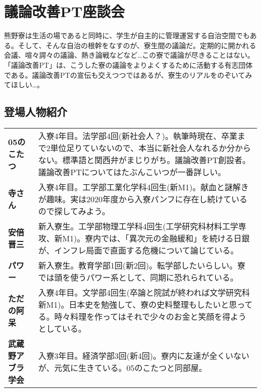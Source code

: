 

\section{議論改善PT座談会}
\label{sec:gironkaizen}

熊野寮は生活の場であると同時に、学生が自主的に管理運営する自治空間でもある。そして、そんな自治の根幹をなすのが、寮生間の議論だ。定期的に開かれる会議、喧々諤々の議論、熱き論戦などなど…この寮で議論が尽きることはない。「議論改善PT」は、こうした寮の議論をよりよくするために活動する有志団体である。議論改善PTの宣伝も交えつつではあるが、寮生のリアルをのぞいてみてほしい…。

\subsection{登場人物紹介}

\begin{table}[h]
    \begin{tabular}{lp{13cm}}
        \hline
        \vspace{2mm}
\textbf{05のこたつ}
&
入寮4年目。法学部4回(新社会人？)。執筆時現在、卒業まで2単位足りていないので、本当に新社会人なれるか分からない。標準語と関西弁がまじりがち。議論改善PT創設者。議論改善PTについてはたぶんこいつが一番詳しい。
\\
\vspace{2mm}
\textbf{寺さん}
&
入寮4年目。工学部工業化学科4回生(新M1)。献血と謎解きが趣味。実は2020年度から入寮パンフに存在し続けているので探してみよう。
\\
\vspace{2mm}
\textbf{安倍晋三}
&
新入寮生。工学部物理工学科4回生(工学研究科材料工学専攻、新M1)。寮内では、「異次元の金融緩和」を続ける日銀が、インフレ局面で直面する危機について論じている。
\\
\vspace{2mm}
\textbf{パワー}
&
新入寮生。教育学部1回(新2回)。転学部したいらしい。寮では頭を使うパワー系として、同期に恐れられている。
\\
\vspace{2mm}
\textbf{ただの阿呆}
&
入寮4年目。文学部4回生(卒論と院試が終われば文学研究科新M1)。日本史を勉強して、寮の史料整理もしたいと思ってる。時々料理を作ってはそれで少々のお金と笑顔を得ようとしている。
\\
\vspace{2mm}
\textbf{武蔵野アブラ学会}
&
入寮3年目。経済学部3回(新4回)。寮内に友達が全くいないが、元気に生きている。05のこたつと同部屋。\\
\hline
    \end{tabular}
\end{table}



